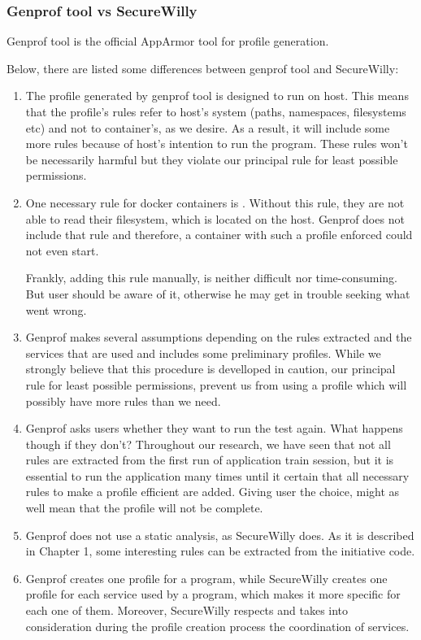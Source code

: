 \subsubsection{Genprof tool vs SecureWilly}

Genprof tool is the official AppArmor tool for profile generation.

Below, there are listed some differences between genprof tool and SecureWilly:

\begin{enumerate}
\item The profile generated by genprof tool is designed to run on host. This means that the profile's rules refer to host's system (paths, namespaces, filesystems etc) and not to container's, as we desire.
As a result, it will include some more rules because of host's intention to run the program. These rules won't be necessarily harmful but they violate our principal rule for least possible permissions.

\item One necessary rule for docker containers is . Without this rule, they are not able to read their filesystem, which is located on the host. Genprof does not include that rule and therefore, a container with such a profile enforced could not even start.

Frankly, adding this rule manually, is neither difficult nor time-consuming. But user should be aware of it, otherwise he may get in trouble seeking what went wrong.

\item Genprof makes several assumptions depending on the rules extracted and the services that are used and includes some preliminary profiles. While we strongly believe that this procedure is develloped in caution, our principal rule for least possible permissions, prevent us from using a profile which will possibly have more rules than we need.

\item Genprof asks users whether they want to run the test again. What happens though if they don't? Throughout our research, we have seen that not all rules are extracted from the first run of application train session, but it is essential to run the application many times until it certain that all necessary rules to make a profile efficient are added. Giving user the choice, might as well mean that the profile will not be complete.

\item Genprof does not use a static analysis, as SecureWilly does. As it is described in Chapter 1, some interesting rules can be extracted from the initiative code.

\item Genprof creates one profile for a program, while SecureWilly creates one profile for each service used by a program, which makes it more specific for each one of them. Moreover, SecureWilly respects and takes into consideration during the profile creation process the coordination of services.
\end{enumerate}
